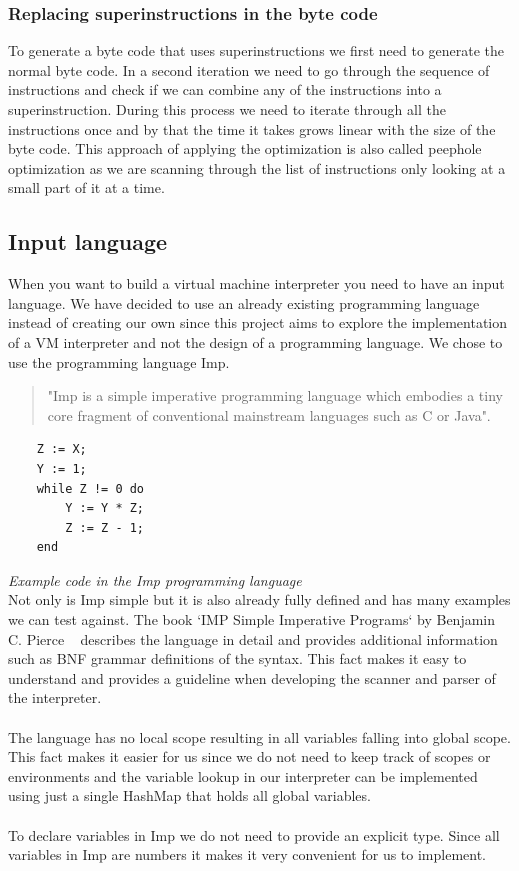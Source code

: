 \documentclass{article}
\begin{document}
\subsubsection{Replacing superinstructions in the byte code}
\label{sec:replacing_superinstructions}
To generate a byte code that uses superinstructions we first need to generate the
normal byte code. In a second iteration we need to go through the sequence of
instructions and check if we can combine any of the instructions into a
superinstruction. During this process we need to iterate through all the
instructions once and by that the time it takes grows linear with the size of
the byte code. This approach of applying the optimization is also called
peephole optimization as we are scanning through the list of instructions
only looking at a small part of it at a time.

\subsection{Input language} %
\label{sec:input_language}
When you want to build a virtual machine interpreter you need to have an
input language. We have decided to use an already existing programming
language instead of creating our own since this project aims to explore
the implementation of a VM interpreter and not the design of a programming
language. We chose to use the programming language Imp. ~\cite{Pierce:SF1}

\begin{quotation}
"Imp is a simple imperative programming language which embodies a tiny core
fragment of conventional mainstream languages such as C or Java". ~\cite{Pierce:SF1}
\end{quotation}

\begin{verbatim}
    Z := X;
    Y := 1;
    while Z != 0 do
        Y := Y * Z;
        Z := Z - 1;
    end
\end{verbatim}
\textit{Example code in the Imp programming language} \\

Not only is Imp simple but it is also already fully defined and has many
examples we can test against. The book `IMP Simple Imperative Programs` by
Benjamin C. Pierce ~\cite{Pierce:SF1} describes the language in detail and
provides additional information such as BNF grammar definitions of the syntax.
This fact makes it easy to understand and provides a guideline when developing
the scanner and parser of the interpreter.
\\\\
The language has no local scope resulting in all variables falling into global
scope. This fact makes it easier for us since we do not need to keep track of
scopes or environments and the variable lookup in our interpreter can be
implemented using just a single HashMap that holds all global variables.
\\\\
To declare variables in Imp we do not need to provide an explicit type. Since
all variables in Imp are numbers it makes it very convenient for us to implement.
\end{document}
